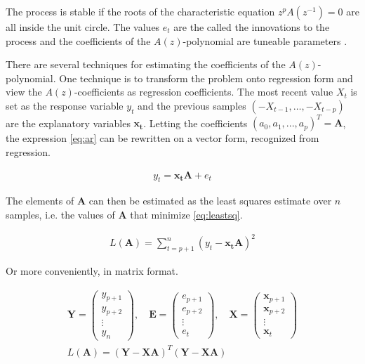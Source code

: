 The process is stable if the roots of the characteristic equation $z^p A(z^{-1}) = 0$ are all inside the unit circle. The values $e_t$ are the called the innovations to the process and the coefficients of the $A(z)$-polynomial are tuneable parameters \citep{lindgren2014stationary}. 

There are several techniques for estimating the coefficients of the $A(z)$-polynomial. One technique is to transform the problem onto regression form and view the $A(z)$-coefficients as regression coefficients. The most recent value $X_t$ is set as the response variable $y_t$ and the previous samples $(-X_{t-1},\dots,-X_{t-p})$ are the explanatory variables $\mathbf{x_t}$. Letting the coefficients $(a_0, a_1,...,a_p)^T = \mathbf{A} $, the expression \ref{eq:ar} can be rewritten on a vector form, recognized from regression. 

\begin{align}
    y_t = \mathbf{x_t} \mathbf{A} + e_t
\end{align}

The elements of $\mathbf{A}$ can then be estimated as the least squares estimate over $n$ samples, i.e. the values of $\mathbf{A}$ that minimize \ref{eq:leastsq}. 

\begin{align}
    L(\mathbf{A}) = \sum_{t=p+1}^n (y_t - \mathbf{x_t} \mathbf{A})^2 \label{eq:leastsq}
\end{align}

Or more conveniently, in matrix format. 

\begin{align}
    \mathbf{Y} = \begin{pmatrix}
    y_{p+1} \\
    y_{p+2} \\
    \vdots \\
    y_n
    \end{pmatrix} , \hspace{1em} \mathbf{E} = \begin{pmatrix}
    e_{p+1} \\
    e_{p+2} \\
    \vdots \\
    e_t
    \end{pmatrix} , \hspace{1em} \mathbf{X} = \begin{pmatrix}
    \mathbf{x}_{p+1} \\
    \mathbf{x}_{p+2} \\
    \vdots \\
    \mathbf{x}_{t}
    \end{pmatrix} \\[10pt] 
    L(\mathbf{A}) = (\mathbf{Y} - \mathbf{X}\mathbf{A})^T(\mathbf{Y} - \mathbf{X}\mathbf{A})
    \label{eq:leastsqmat}
\end{align}


